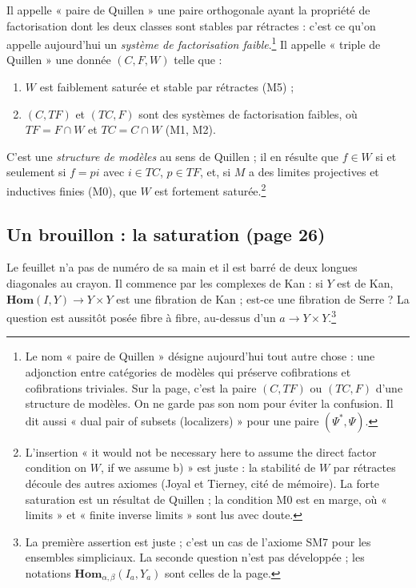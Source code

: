 \documentclass[11pt,a4paper]{article}
\begin{document}
Il appelle « paire de Quillen » une paire orthogonale ayant la propriété de
factorisation dont les deux classes sont stables par rétractes : c'est ce
qu'on appelle aujourd'hui un \emph{système de factorisation
faible}.\footnote{Le nom « paire de Quillen » désigne aujourd'hui tout autre
chose : une adjonction entre catégories de modèles qui préserve cofibrations
et cofibrations triviales. Sur la page, c'est la paire $(C, TF)$ ou $(TC, F)$
d'une structure de modèles. On ne garde pas son nom pour éviter la confusion.
Il dit aussi « dual pair of subsets (localizers) » pour une paire
$(\Psi^*, \Psi)$.} Il appelle « triple de Quillen » une donnée $(C, F, W)$
telle que :
\begin{enumerate}
\item[a)] $W$ est faiblement saturée et stable par rétractes (M5) ;
\item[b)] $(C, TF)$ et $(TC, F)$ sont des systèmes de factorisation faibles,
où $TF = F \cap W$ et $TC = C \cap W$ (M1, M2).
\end{enumerate}
C'est une \emph{structure de modèles} au sens de Quillen ; il en résulte que
$f \in W$ si et seulement si $f = pi$ avec $i \in TC$, $p \in TF$, et, si $M$
a des limites projectives et inductives finies (M0), que $W$ est fortement
saturée.\footnote{L'insertion « it would not be necessary here to assume the
direct factor condition on $W$, if we assume b) » est juste : la stabilité de
$W$ par rétractes découle des autres axiomes (Joyal et Tierney, cité de
mémoire). La forte saturation est un résultat de Quillen ; la condition M0 est
en marge, où « limits » et « finite inverse limits » sont lus avec doute.}

\subsection*{Un brouillon : la saturation (page 26)}

Le feuillet n'a pas de numéro de sa main et il est barré de deux longues
diagonales au crayon. Il commence par les complexes de Kan : si $Y$ est de
Kan, $\mathbf{Hom}(I, Y) \to Y \times Y$ est une fibration de Kan ; est-ce une
fibration de Serre ? La question est aussitôt posée fibre à fibre, au-dessus
d'un $a \to Y \times Y$.\footnote{La première assertion est juste ; c'est un
cas de l'axiome SM7 pour les ensembles simpliciaux. La seconde question n'est
pas développée ; les notations $\mathbf{Hom}_{\alpha, \beta}(I_a, Y_a)$ sont
celles de la page.}
\end{document}

